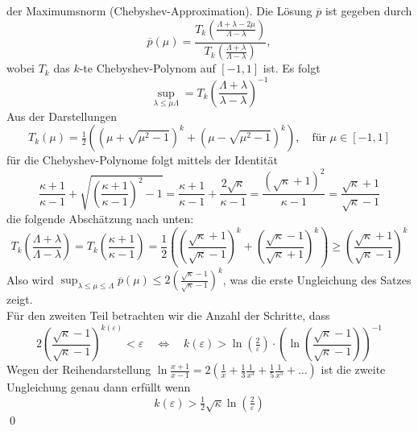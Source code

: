 \documentclass{article}
\begin{document}
    der Maximumsnorm (Chebyshev-Approximation).
    Die Lösung $\overline{p}$ ist gegeben durch 
    \[\overline{p}(\mu) = \dfrac{T_k(\tfrac{\Lambda+\lambda-2\mu}{\Lambda-\lambda})}
    {T_k(\tfrac{\Lambda+\lambda}{\Lambda-\lambda})},\]
    wobei $T_k$ das $k$-te Chebyshev-Polynom auf $[-1,1]$ ist. Es folgt
    \[\sup_{\lambda\leq\mu\Lambda} = T_k\left(\dfrac{\Lambda+\lambda}{\lambda-\lambda}\right)^{-1}\]
    Aus der Darstellungen
    \[T_k(\mu) = \tfrac{1}{2}\left((\mu+\sqrt{\mu^2-1})^k+(\mu-\sqrt{\mu^2-1})^k\right), 
    \quad \text{für } \mu\in[-1,1]\]
    für die Chebyshev-Polynome folgt mittels der Identität
    \[\dfrac{\kappa+1}{\kappa-1} + \sqrt{\left(\dfrac{\kappa+1}{\kappa-1}\right)^2-1} 
    = \dfrac{\kappa+1}{\kappa-1} + \dfrac{2\sqrt{\kappa}}{\kappa-1} = \dfrac{(\sqrt{\kappa}+1)^2}{\kappa - 1}
    = \dfrac{\sqrt{\kappa}+1}{\sqrt{\kappa}-1}\]
    die folgende Abschätzung nach unten:
    \[T_k\left(\dfrac{\Lambda+\lambda}{\Lambda-\lambda}\right) = T_k\left(\dfrac{\kappa+1}{\kappa-1}\right)
    = \dfrac{1}{2}\left(\left(\dfrac{\sqrt{\kappa}+1}{\sqrt{\kappa}-1}\right)^k + 
    \left(\dfrac{\sqrt{\kappa}-1}{\sqrt{\kappa}+1}\right)^k\right) 
    \geq \left(\dfrac{\sqrt{\kappa}+1}{\sqrt{\kappa}-1}\right)^k\]
    Also wird $\sup_{\lambda\leq\mu\leq\Lambda}\overline{p}(\mu)
    \leq 2\left(\tfrac{\sqrt{\kappa}-1}{\sqrt{\kappa}-1}\right)^k$, was die erste Ungleichung des Satzes zeigt. \\
    Für den zweiten Teil betrachten wir die Anzahl der Schritte, dass
    \[2\left(\dfrac{\sqrt{\kappa}-1}{\sqrt{\kappa}-1}\right)^{k(\varepsilon)} < \varepsilon \quad \iff \quad 
    k(\varepsilon) > \ln(\tfrac{2}{\varepsilon})\cdot
    \left(\ln\left(\dfrac{\sqrt{\kappa}-1}{\sqrt{\kappa}-1}\right)\right)^{-1}\]
    Wegen der Reihendarstellung $\ln\tfrac{x+1}{x-1} = 2(\tfrac{1}{x} + \tfrac{1}{3}\tfrac{1}{x^3} 
    + \tfrac{1}{5}\tfrac{1}{x^5} + \dotsc)$ ist die zweite Ungleichung genau dann erfüllt wenn 
    \[k(\varepsilon) > \tfrac{1}{2}\sqrt{\kappa}\ln(\tfrac{2}{\varepsilon})\]
    \qed
\end{document}
